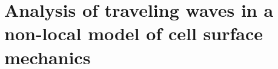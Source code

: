 \renewcommand{\thefootnote}{$\star$} 

\chapter{Analysis of traveling waves in a non-local model of cell surface mechanics}












